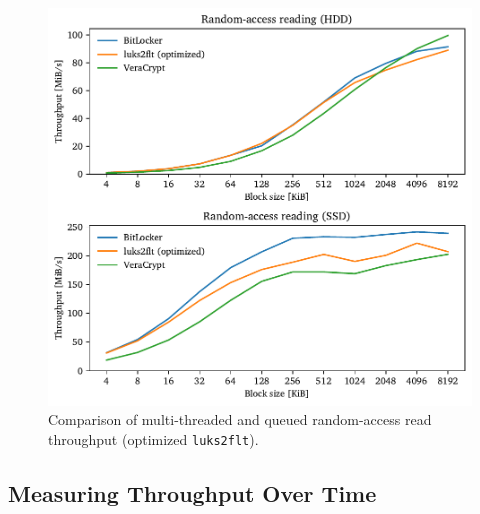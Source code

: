 \begin{figure}[htb!]
	\center
	\includegraphics[scale=1]{../fig/performance.hwexperiments.optrandthreadsqueue.pdf}
	\caption[
		Comparison of multi-threaded and queued random-access read throughput (optimized \texttt{luks2flt})
	]{
		Comparison of multi-threaded and queued random-access read throughput (optimized \texttt{luks2flt}). 
	}
	\label{fig:performance.hwexperiments.optrandthreadsqueue}
\end{figure}

\subsection{Measuring Throughput Over Time}
\label{chap:performance.hwexperiments.throughputovertime}

